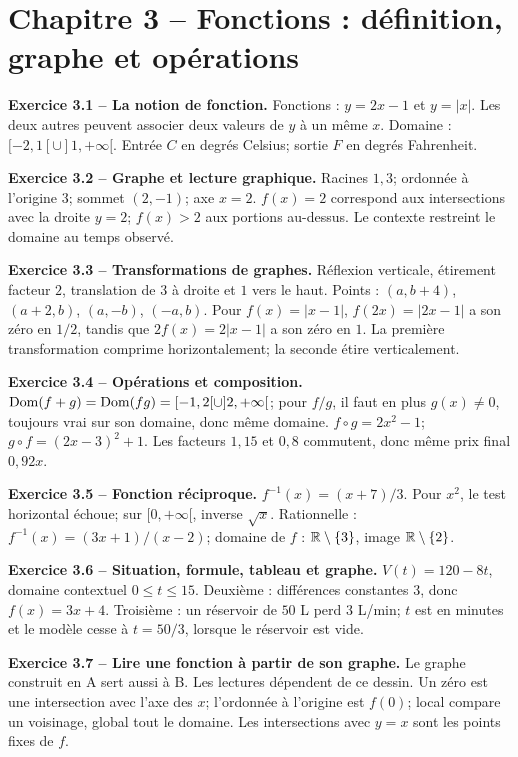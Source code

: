 \chapter*{Chapitre 3 -- Fonctions : définition, graphe et opérations}
\begin{answerbox}
\textbf{Exercice 3.1 -- La notion de fonction.} Fonctions : $y=2x-1$ et $y=|x|$. Les deux autres peuvent associer deux valeurs de $y$ à un même $x$. Domaine : $[-2,1[\cup]1,+\infty[$. Entrée $C$ en degrés Celsius; sortie $F$ en degrés Fahrenheit.\par
\textbf{Exercice 3.2 -- Graphe et lecture graphique.} Racines $1,3$; ordonnée à l'origine $3$; sommet $(2,-1)$; axe $x=2$. $f(x)=2$ correspond aux intersections avec la droite $y=2$; $f(x)>2$ aux portions au-dessus. Le contexte restreint le domaine au temps observé.\par
\textbf{Exercice 3.3 -- Transformations de graphes.} Réflexion verticale, étirement facteur $2$, translation de $3$ à droite et $1$ vers le haut. Points : $(a,b+4)$, $(a+2,b)$, $(a,-b)$, $(-a,b)$. Pour \(f(x)=|x-1|\), \(f(2x)=|2x-1|\) a son zéro en \(1/2\), tandis que \(2f(x)=2|x-1|\) a son zéro en \(1\). La première transformation comprime horizontalement; la seconde étire verticalement.\par
\textbf{Exercice 3.4 -- Opérations et composition.} $\operatorname{Dom}(f+g)=\operatorname{Dom}(fg)=[-1,2[\cup]2,+\infty[$; pour $f/g$, il faut en plus $g(x)\neq0$, toujours vrai sur son domaine, donc même domaine. $f\circ g=2x^2-1$; $g\circ f=(2x-3)^2+1$. Les facteurs $1{,}15$ et $0{,}8$ commutent, donc même prix final $0{,}92x$.\par
\textbf{Exercice 3.5 -- Fonction réciproque.} $f^{-1}(x)=(x+7)/3$. Pour $x^2$, le test horizontal échoue; sur $[0,+\infty[$, inverse $\sqrt{x}$. Rationnelle : $f^{-1}(x)=(3x+1)/(x-2)$; domaine de $f$ : $\mathbb{R}\setminus\{3\}$, image $\mathbb{R}\setminus\{2\}$.\par
\textbf{Exercice 3.6 -- Situation, formule, tableau et graphe.} $V(t)=120-8t$, domaine contextuel $0\le t\le15$. Deuxième : différences constantes $3$, donc $f(x)=3x+4$. Troisième : un réservoir de \(50\) L perd \(3\) L/min; \(t\) est en minutes et le modèle cesse à \(t=50/3\), lorsque le réservoir est vide.\par
\textbf{Exercice 3.7 -- Lire une fonction à partir de son graphe.} Le graphe construit en A sert aussi à B. Les lectures dépendent de ce dessin. Un zéro est une intersection avec l'axe des $x$; l'ordonnée à l'origine est $f(0)$; local compare un voisinage, global tout le domaine. Les intersections avec $y=x$ sont les points fixes de $f$.\par

\end{answerbox}

